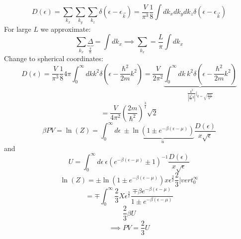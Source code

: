 \documentclass[11pt]{book}
\theoremstyle{definition}
\begin{document}
\[ D(\epsilon) = \sum_{k_x} \sum_{k_y} \sum_{k_z} \delta( \epsilon- \epsilon_{\vec{k}}) = \frac{V}{\pi^3} \frac{1}{8} \int dk_x dk_y dk_z \delta( \epsilon - \epsilon_{\vec{k}} ) \] 
For large $ L $ we approximate:
\[ \sum_{k_x} \underbrace{\Delta}_{\frac{\pi}{L}} = \int dk_x \implies \sum_{k_{x}} = \frac{L}{\pi} \int dk_x\] 
Change to spherical coordinates:
\[ D( \epsilon) = \frac{V}{\pi^3} \frac{1}{8} 4\pi \int_{0}^{\infty} dk k^2 \delta( \epsilon - \frac{\hbar^2}{2m}k^2 ) = \frac{V}{2\pi^2} 
\underbrace{\int_{0}^{\infty} dk \: k^2 \delta( \epsilon - \frac{\hbar^2}{2m}k^2 ) }_{\frac{k^2}{\left|\frac{\hbar^2}{m}k\right|} \vert_{k= \sqrt{\frac{2m \epsilon}{\hbar^2}}}}
\] 
\[  = \frac{V}{4\pi^2} \left( \frac{2m}{\hbar^2} \right)^{\frac{3}{1}} \sqrt{2} \] 
\[ \beta PV = \ln(Z) = \int_0^{\infty} d\epsilon \: \pm 
\underbrace{\ln(1\pm e^{-\beta( \epsilon - \mu )})}_{u}  
\frac{D(\epsilon)}{x\sqrt{\epsilon}}
\] 
and
\[ U = \int_0^{\infty} d\epsilon \: \epsilon \left( e^{-\beta(\epsilon-\mu)} \pm 1 \right)^{-1} \frac{D(\epsilon)}{x\sqrt{\epsilon}}  \] 
\[ \ln(Z) = \pm \ln(1 \pm e^{-\beta( \epsilon-\mu )}) x \epsilon^{\frac{3}{2}} \frac{2}{3} |vert_{0}^{\infty}   \] 
\[  = \mp \int_0^{\infty} \frac{2}{3}X \epsilon^{\frac{3}{2}} \frac{\mp \beta e^{-\beta(\epsilon-\mu)}}{1 \pm e^{-\beta (\epsilon-\mu)}}\] 
\[ \frac{2}{3}\beta U \] 
\[ \implies PV = \frac{2}{3}U \] 
\end{document}
